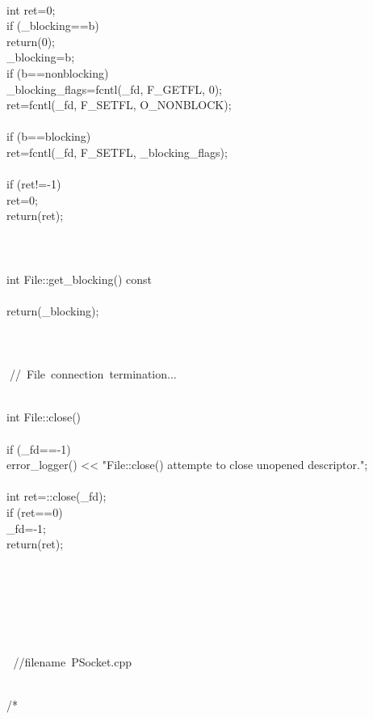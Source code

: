 \documentclass{article}
\begin{document}
 {
\\
     int ret=0;
\\
     if (_blocking==b)
\\
         return(0);
\\
         _blocking=b;
\\
     if (b==nonblocking) {
\\
         _blocking_flags=fcntl(_fd, F_GETFL, 0);
\\
         ret=fcntl(_fd, F_SETFL, O_NONBLOCK);
\\
     }  
\\
     if (b==blocking) {
\\
         ret=fcntl(_fd, F_SETFL, _blocking_flags);
\\
     }
\\
     if (ret!=-1)
\\
         ret=0;
\\
     return(ret);
\\
 }
\\
 
\\
 
\\
 int File::get_blocking() const
\\
 {
\\
         return(_blocking);
\\
 }
\\
 
\\
 
\\
 
\hbox{// File connection termination...}\strut\\
 int File::close()
\\
 {
\\
         if (_fd==-1) {
\\
                 error_logger() << "File::close() attempte to close unopened descriptor.\n";
\\
         }
\\
         int ret=::close(_fd);
\\
         if (ret==0)
\\
                 _fd=-1;
\\
         return(ret);
\\
 }
\\
 
\\
 
\\
\strut\\
\strut\goodbreak
{}\strut\nopagebreak\\
 
\hbox{//$$filename PSocket.cpp}\strut\\
\hbox{/*}
\end{document}
